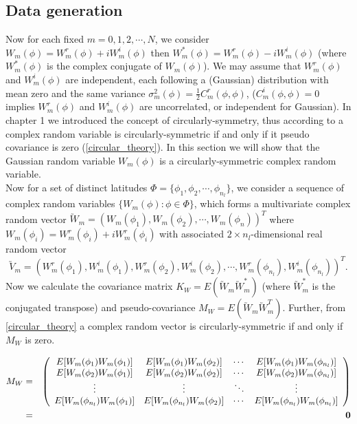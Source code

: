 	\subsection{Data generation}
		
	Now for each fixed $m = 0, 1, 2, \cdots, N$, we consider  $W_m(\phi) = W_m^r(\phi) + i W_m^i(\phi)$ then $W_m^*(\phi) = W_m^r(\phi) - i W_m^i(\phi)$ (where $W_m^*(\phi)$ is the complex conjugate of $W_m(\phi)$). We may assume that $W_m^r(\phi)$ and $W_m^i(\phi)$ are independent, each following a (Gaussian) distribution with mean zero and the same variance $\sigma_m^2(\phi) = \frac{1}{2}C_m^r(\phi, \phi)$, ($C_m^i(\phi, \phi) = 0$ implies $W_m^r(\phi)$ and $W_m^i(\phi)$ are uncorrelated, or independent for Gaussian). In chapter 1 we introduced the concept of circularly-symmetry, thus according to \cite{Gallager2008} a complex random variable is circularly-symmetric if and only if it pseudo covariance is zero (\ref{circular_theory}). In this section we will show that the Gaussian random variable $W_m(\phi)$ is a circularly-symmetric complex random variable.  \\
		
	Now for a set of distinct latitudes $\Phi = \{\phi_1, \phi_2, \cdots, \phi_{n_l}\}$, we consider a sequence of complex random variables $\{W_m(\phi): \phi \in \Phi\}$, which forms a multivariate complex random vector $\utilde{W}_m = (W_m(\phi_1), W_m(\phi_2), \cdots, W_m(\phi_n))^T$ where $W_m(\phi_i) = W_m^r(\phi_i) + iW_m^r(\phi_i)$ with associated $2\times n_l$-dimensional real random vector
	$$\utilde{V}_m = (W_m^r(\phi_1), W_m^i(\phi_1),W_m^r(\phi_2), W_m^i(\phi_2),\cdots, W_m^r(\phi_{n_l}), W_m^i(\phi_{n_l}))^T.$$
	Now we calculate the covariance matrix $K_W = E(\utilde{W}_m\utilde{W}_m^*)$ (where $\utilde{W}_m^*$ is the conjugated transpose) and pseudo-covariance $M_W = E(\utilde{W}_m\utilde{W}_m^T)$. Further, from \ref{circular_theory} a complex random vector is circularly-symmetric if and only if $M_W$ is zero.
		
	\begin{eqnarray*}
		M_W & = & \left(\begin{array}{cccc}
		E[W_m(\phi_1) W_m(\phi_1) ] & E[W_m(\phi_1) W_m(\phi_2) ]  & \cdots & E[W_m(\phi_1) W_m(\phi_{n_l}) ]\\
		E[W_m(\phi_2) W_m(\phi_1) ] & E[W_m(\phi_2) W_m(\phi_2) ]  & \cdots & E[W_m(\phi_2) W_m(\phi_{n_l}) ]\\
		\vdots & \vdots  & \ddots & \vdots \\
		E[W_m(\phi_{n_l}) W_m(\phi_1) ] & E[W_m(\phi_{n_l}) W_m(\phi_2) ]  & \cdots & E[W_m(\phi_{n_l}) W_m(\phi_{n_l})]
		\end{array}
		\right)\\
		&=& {\bf 0}
	\end{eqnarray*}
		
